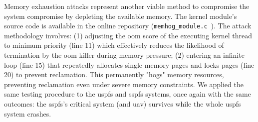 
Memory exhaustion attacks represent another viable method to compromise the
system compromise by depleting the available memory.
The kernel module's source code is available in the
online repository (\lstinline{memhog_module.c}~\cite{thesis-sw-github}).
The attack methodology involves: (1) adjusting the \gls{oom} score of the
executing kernel thread to minimum priority (line 11) which effectively
reduces the likelihood of termination by the \gls{oom} killer during memory
pressure; (2) entering an infinite loop (line 15) that repeatedly allocates
single memory pages and locks pages (line 20) to prevent reclamation. This
permanently "hogs" memory resources, preventing reclamation even under severe
memory constraints.
%
We applied
the same testing procedure to the \gls{uspfs} and \gls{sspfs} systems, once
again with the same outcomes: the \gls{sspfs}'s critical system (and \gls{uav})
survives while the whole \gls{uspfs} system crashes.




